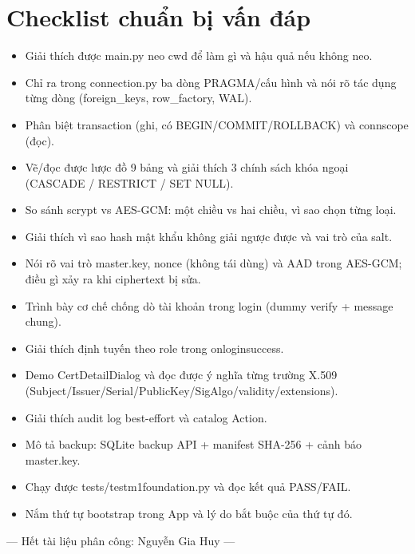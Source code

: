 \documentclass[12pt,a4paper]{article}
\newcommand{\code}[1]{{\ttfamily\small\def\_{\textunderscore\discretionary{}{}{}}#1}}
\begin{document}
\section{Checklist chuẩn bị vấn đáp}

\begin{itemize}
  \item[\textbf{$\square$}] Giải thích được \code{main.py} neo cwd để làm gì và hậu
        quả nếu không neo.
  \item[\textbf{$\square$}] Chỉ ra trong \code{connection.py} ba dòng PRAGMA/cấu
        hình và nói rõ tác dụng từng dòng (foreign\_keys, row\_factory, WAL).
  \item[\textbf{$\square$}] Phân biệt \code{transaction} (ghi, có
        BEGIN/COMMIT/ROLLBACK) và \code{conn\_scope} (đọc).
  \item[\textbf{$\square$}] Vẽ/đọc được lược đồ 9 bảng và giải thích 3 chính sách
        khóa ngoại (CASCADE / RESTRICT / SET NULL).
  \item[\textbf{$\square$}] So sánh scrypt vs AES-GCM: một chiều vs hai chiều, vì
        sao chọn từng loại.
  \item[\textbf{$\square$}] Giải thích vì sao hash mật khẩu không giải ngược được
        và vai trò của salt.
  \item[\textbf{$\square$}] Nói rõ vai trò master.key, nonce (không tái dùng) và
        AAD trong AES-GCM; điều gì xảy ra khi ciphertext bị sửa.
  \item[\textbf{$\square$}] Trình bày cơ chế chống dò tài khoản trong \code{login}
        (dummy verify + message chung).
  \item[\textbf{$\square$}] Giải thích định tuyến theo role trong
        \code{on\_login\_success}.
  \item[\textbf{$\square$}] Demo \code{CertDetailDialog} và đọc được ý nghĩa từng
        trường X.509 (Subject/Issuer/Serial/PublicKey/SigAlgo/validity/extensions).
  \item[\textbf{$\square$}] Giải thích audit log best-effort và catalog
        \code{Action}.
  \item[\textbf{$\square$}] Mô tả backup: SQLite backup API + manifest SHA-256 +
        cảnh báo master.key.
  \item[\textbf{$\square$}] Chạy được \code{tests/test\_m1\_foundation.py} và đọc
        kết quả PASS/FAIL.
  \item[\textbf{$\square$}] Nắm thứ tự bootstrap trong \code{App} và lý do bắt
        buộc của thứ tự đó.
\end{itemize}

\vfill
\begin{center}
\footnotesize\color{cmt}
--- Hết tài liệu phân công: Nguyễn Gia Huy ---
\end{center}
\end{document}
